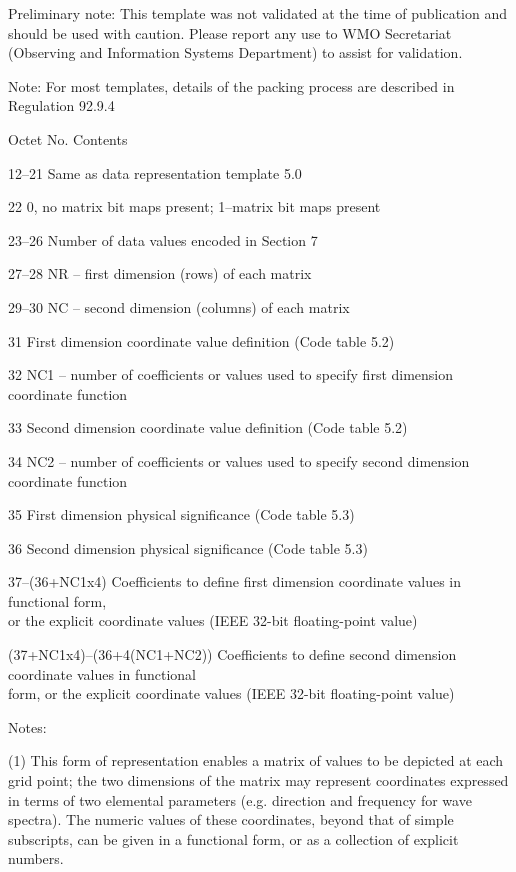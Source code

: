 Preliminary note: This template was not validated at the time of publication and should be used with caution. Please report any use to WMO Secretariat (Observing and Information Systems Department) to assist for validation.

Note: For most templates, details of the packing process are described in Regulation 92.9.4

Octet No. Contents

12--21 Same as data representation template 5.0

22 0, no matrix bit maps present; 1--matrix bit maps present

23--26 Number of data values encoded in Section 7

27--28 NR -- first dimension (rows) of each matrix

29--30 NC -- second dimension (columns) of each matrix

31 First dimension coordinate value definition (Code table 5.2)

32 NC1 -- number of coefficients or values used to specify first dimension coordinate function

33 Second dimension coordinate value definition (Code table 5.2)

34 NC2 -- number of coefficients or values used to specify second dimension coordinate function

35 First dimension physical significance (Code table 5.3)

36 Second dimension physical significance (Code table 5.3)

37--(36+NC1x4) Coefficients to define first dimension coordinate values in functional form,\\
or the explicit coordinate values (IEEE 32-bit floating-point value)

(37+NC1x4)--(36+4(NC1+NC2)) Coefficients to define second dimension coordinate values in functional\\
form, or the explicit coordinate values (IEEE 32-bit floating-point value)

Notes:

(1) This form of representation enables a matrix of values to be depicted at each grid point; the two dimensions of the matrix may represent coordinates expressed in terms of two elemental parameters (e.g. direction and frequency for wave spectra). The numeric values of these coordinates, beyond that of simple subscripts, can be given in a functional form, or as a collection of explicit numbers.

